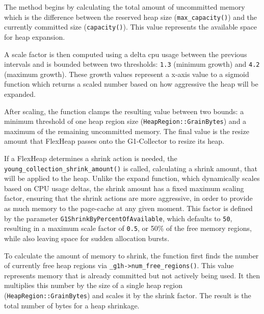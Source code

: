 The method begins by calculating the total amount of uncommitted memory which is the difference
between the reserved heap size (\texttt{max\_capacity()}) and the currently committed size 
(\texttt{capacity()}). This value represents the available space for heap expansion.

A scale factor is then computed using a delta cpu usage between the previous intervals and is bounded between two thresholds: \texttt{1.3} 
(minimum growth) and \texttt{4.2} (maximum growth). These growth values represent a x-axis value to a sigmoid
function which returns a scaled number based on how aggressive the heap will be expanded.

After scaling, the function clamps the resulting value between two bounds: a minimum threshold of one heap region size 
(\texttt{HeapRegion::GrainBytes}) and a maximum of the remaining uncommitted memory. 
The final value is the resize amount that FlexHeap passes onto the G1-Collector to resize its heap.

If a FlexHeap determines a shrink action is needed, the \texttt{young\_collection\_shrink\_amount()} is called, calculating a shrink amount,
that will be applied to the heap. Unlike the expand function, 
which dynamically scales based on CPU usage deltas, the shrink amount has a fixed maximum scaling factor, ensuring that the
shrink actions are more aggressive, in order to provide as much memory to the page-cache at any given moment. 
This factor is defined by the parameter \texttt{G1ShrinkByPercentOfAvailable}, 
which defaults to \texttt{50}, resulting in a maximum scale factor of \texttt{0.5}, or 50\% of the free memory regions,
while also leaving space for sudden allocation bursts.

To calculate the amount of memory to shrink, the function first finds the number of currently free heap 
regions via \texttt{\_g1h->num\_free\_regions()}. This value represents memory that is already committed but 
not actively being used. It then multiplies this number by the size of a single heap region (\texttt{HeapRegion::GrainBytes})
and scales it by the shrink factor. The result is the total number of bytes for a heap shrinkage.
%

